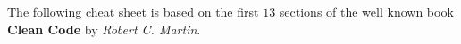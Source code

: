 
The following cheat sheet is based on the first $13$ sections of the well known book \textbf{Clean Code}
by \textit{Robert C. Martin}.